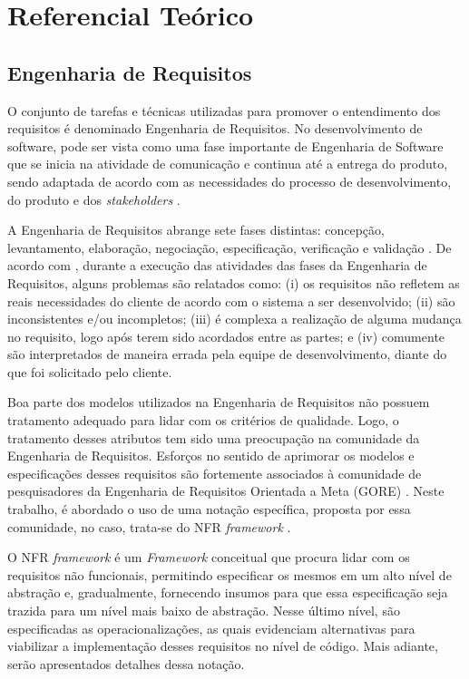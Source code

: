 \chapter[Referencial Teórico]{Referencial Teórico}

\section{Engenharia de Requisitos}

O conjunto de tarefas e técnicas utilizadas para promover o entendimento dos requisitos é denominado Engenharia de Requisitos. No desenvolvimento de software, pode ser vista como uma fase importante de Engenharia de Software que se inicia na atividade de comunicação e continua até a entrega do produto, sendo adaptada de acordo com as necessidades do processo de desenvolvimento, do produto e dos \textit{stakeholders} \cite{pressman2011engenharia}.

A Engenharia de Requisitos abrange sete fases distintas: concepção, levantamento, elaboração, negociação, especificação, verificação e validação \cite{pressman2011engenharia}. De acordo com \cite{kotonya1998requirements}, durante a execução das atividades das fases da Engenharia de Requisitos, alguns problemas são relatados como: (i) os requisitos não refletem as reais necessidades do cliente de acordo com o sistema a ser desenvolvido; (ii) são inconsistentes e/ou incompletos; (iii) é complexa a realização de alguma mudança no requisito, logo após terem sido acordados entre as partes; e (iv) comumente são interpretados de maneira errada pela equipe de desenvolvimento, diante do que foi solicitado pelo cliente. 


Boa parte dos modelos utilizados na Engenharia de Requisitos não possuem tratamento adequado para lidar com os critérios de qualidade. Logo, o tratamento desses atributos tem sido uma preocupação na comunidade da Engenharia de Requisitos. Esforços no sentido de aprimorar os modelos e especificações desses requisitos são fortemente associados à comunidade de pesquisadores da Engenharia de Requisitos Orientada a Meta (GORE) \cite{chung2012non}. Neste trabalho, é abordado o uso de uma notação específica, proposta por essa comunidade, no caso, trata-se do NFR \textit{framework} \cite{chung2012non}. 

O NFR \textit{framework} é um \textit{Framework} conceitual que procura lidar com os requisitos não funcionais, permitindo especificar os mesmos em um alto nível de abstração e, gradualmente, fornecendo insumos para que essa especificação seja trazida para um nível mais baixo de abstração. Nesse último nível, são especificadas as operacionalizações, as quais evidenciam alternativas para viabilizar a implementação desses requisitos no nível de código. Mais adiante, serão apresentados detalhes dessa notação.

